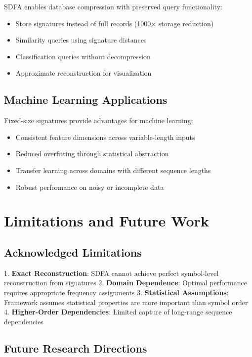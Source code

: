 \documentclass[10pt,journal,compsoc]{IEEEtran}
\newcommand{\sdfa}{\textsc{SDFA}}
\begin{document}
\sdfa{} enables database compression with preserved query functionality:

\begin{itemize}
    \item Store signatures instead of full records (1000× storage reduction)
    \item Similarity queries using signature distances
    \item Classification queries without decompression
    \item Approximate reconstruction for visualization
\end{itemize}

\subsection{Machine Learning Applications}

Fixed-size signatures provide advantages for machine learning:

\begin{itemize}
    \item Consistent feature dimensions across variable-length inputs
    \item Reduced overfitting through statistical abstraction
    \item Transfer learning across domains with different sequence lengths
    \item Robust performance on noisy or incomplete data
\end{itemize}

\section{Limitations and Future Work}

\subsection{Acknowledged Limitations}

1. \textbf{Exact Reconstruction}: \sdfa{} cannot achieve perfect symbol-level reconstruction from signatures
2. \textbf{Domain Dependence}: Optimal performance requires appropriate frequency assignments
3. \textbf{Statistical Assumptions}: Framework assumes statistical properties are more important than symbol order
4. \textbf{Higher-Order Dependencies}: Limited capture of long-range sequence dependencies

\subsection{Future Research Directions}
\end{document}
